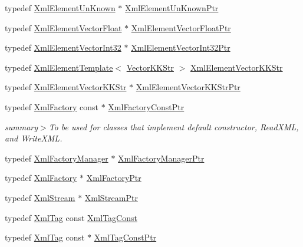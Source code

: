\begin{DoxyCompactItemize}
\item 
typedef \hyperlink{class_k_k_b_1_1_xml_element_un_known}{Xml\+Element\+Un\+Known} $\ast$ \hyperlink{namespace_k_k_b_a62dce0bfa7a46d74f12d9f9994983f68}{Xml\+Element\+Un\+Known\+Ptr}
\item 
typedef \hyperlink{class_k_k_b_1_1_xml_element_vector_float}{Xml\+Element\+Vector\+Float} $\ast$ \hyperlink{namespace_k_k_b_a350f2154a229f20ab70710645677839d}{Xml\+Element\+Vector\+Float\+Ptr}
\item 
typedef \hyperlink{class_k_k_b_1_1_xml_element_vector_int32}{Xml\+Element\+Vector\+Int32} $\ast$ \hyperlink{namespace_k_k_b_aa7420ba313381c36f725ab01f4c5e312}{Xml\+Element\+Vector\+Int32\+Ptr}
\item 
typedef \hyperlink{class_k_k_b_1_1_xml_element_template}{Xml\+Element\+Template}$<$ \hyperlink{class_k_k_b_1_1_vector_k_k_str}{Vector\+K\+K\+Str} $>$ \hyperlink{namespace_k_k_b_ae7f117b12a72568bc7ab4a0322f2c4a4}{Xml\+Element\+Vector\+K\+K\+Str}
\item 
typedef \hyperlink{namespace_k_k_b_ae7f117b12a72568bc7ab4a0322f2c4a4}{Xml\+Element\+Vector\+K\+K\+Str} $\ast$ \hyperlink{namespace_k_k_b_a9681193b83eaa224848a738e348062c9}{Xml\+Element\+Vector\+K\+K\+Str\+Ptr}
\item 
typedef \hyperlink{class_k_k_b_1_1_xml_factory}{Xml\+Factory} const $\ast$ \hyperlink{namespace_k_k_b_a041a4e8001c7f3e92bb2b8d417b47715}{Xml\+Factory\+Const\+Ptr}
\begin{DoxyCompactList}\small\item\em summary$>$To be used for classes that implement default constructor, Read\+X\+ML, and Write\+X\+ML.\end{DoxyCompactList}\item 
typedef \hyperlink{class_k_k_b_1_1_xml_factory_manager}{Xml\+Factory\+Manager} $\ast$ \hyperlink{namespace_k_k_b_aafda05381a8f75c01dcc4c7bca1fac5f}{Xml\+Factory\+Manager\+Ptr}
\item 
typedef \hyperlink{class_k_k_b_1_1_xml_factory}{Xml\+Factory} $\ast$ \hyperlink{namespace_k_k_b_a39be21bf55480cb360e2fd785ad60af1}{Xml\+Factory\+Ptr}
\item 
typedef \hyperlink{class_k_k_b_1_1_xml_stream}{Xml\+Stream} $\ast$ \hyperlink{namespace_k_k_b_a7425eef4d24785a2f1a347bf2bd39114}{Xml\+Stream\+Ptr}
\item 
typedef \hyperlink{class_k_k_b_1_1_xml_tag}{Xml\+Tag} const \hyperlink{namespace_k_k_b_a598bf24afce47ce534af5cc4bd89c726}{Xml\+Tag\+Const}
\item 
typedef \hyperlink{class_k_k_b_1_1_xml_tag}{Xml\+Tag} const $\ast$ \hyperlink{namespace_k_k_b_a5f1b0b1667d79fec26deeff10c43df23}{Xml\+Tag\+Const\+Ptr}

\end{DoxyCompactItemize}
